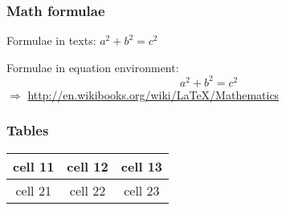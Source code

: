 \begin{frame}
\frametitle{Math formulae}
Formulae in texts: $a^2 + b^2 = c^2$

\noindent Formulae in equation environment:
\begin{equation}
a^2 + b^2 = c^2
\end{equation}
$\Rightarrow$ \url{http://en.wikibooks.org/wiki/LaTeX/Mathematics}
\end{frame}

\begin{frame}
\frametitle{Tables}
\begin{tabular}{c|c|c}
\hline
cell 11 & cell 12 & cell 13 \\
\hline
cell 21 & cell 22 & cell 23 \\
\hline
\end{tabular}
\end{frame}
